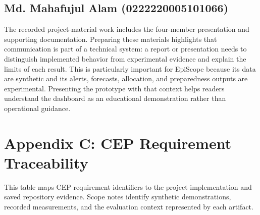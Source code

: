 \documentclass[conference]{IEEEtran}
\begin{document}
\subsection*{Md. Mahafujul Alam (0222220005101066)}
The recorded project-material work includes the four-member presentation and supporting documentation. Preparing these materials highlights that communication is part of a technical system: a report or presentation needs to distinguish implemented behavior from experimental evidence and explain the limits of each result. This is particularly important for EpiScope because its data are synthetic and its alerts, forecasts, allocation, and preparedness outputs are experimental. Presenting the prototype with that context helps readers understand the dashboard as an educational demonstration rather than operational guidance.


\clearpage
\section*{Appendix C: CEP Requirement Traceability}
This table maps CEP requirement identifiers to the project implementation and saved repository evidence. Scope notes identify synthetic demonstrations, recorded measurements, and the evaluation context represented by each artifact.
\end{document}
